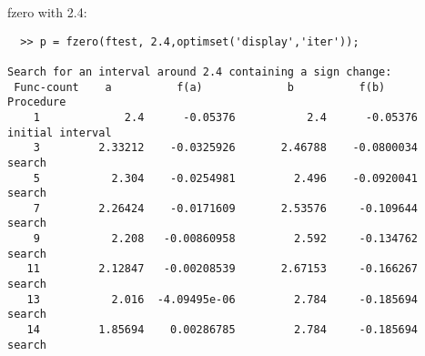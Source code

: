 \documentclass{article}
\begin{document}
fzero with 2.4:
\begin{verbatim}
  >> p = fzero(ftest, 2.4,optimset('display','iter'));
 
Search for an interval around 2.4 containing a sign change:
 Func-count    a          f(a)             b          f(b)        Procedure
    1             2.4      -0.05376           2.4      -0.05376   initial interval
    3         2.33212    -0.0325926       2.46788    -0.0800034   search
    5           2.304    -0.0254981         2.496    -0.0920041   search
    7         2.26424    -0.0171609       2.53576     -0.109644   search
    9           2.208   -0.00860958         2.592     -0.134762   search
   11         2.12847   -0.00208539       2.67153     -0.166267   search
   13           2.016  -4.09495e-06         2.784     -0.185694   search
   14         1.85694    0.00286785         2.784     -0.185694   search
 

\end{verbatim}
\end{document}
